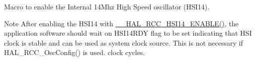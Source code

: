 Macro to enable the Internal 14\+Mhz High Speed oscillator (H\+S\+I14). 

\begin{DoxyNote}{Note}
After enabling the H\+S\+I14 with \hyperlink{group___r_c_c___h_s_i14___configuration_gae918e3236290b9f03f6bd7dc192dceae}{\+\_\+\+\_\+\+H\+A\+L\+\_\+\+R\+C\+C\+\_\+\+H\+S\+I14\+\_\+\+E\+N\+A\+B\+L\+E()}, the application software should wait on H\+S\+I14\+R\+DY flag to be set indicating that H\+SI clock is stable and can be used as system clock source. This is not necessary if H\+A\+L\+\_\+\+R\+C\+C\+\_\+\+Osc\+Config() is used. clock cycles. 
\end{DoxyNote}
